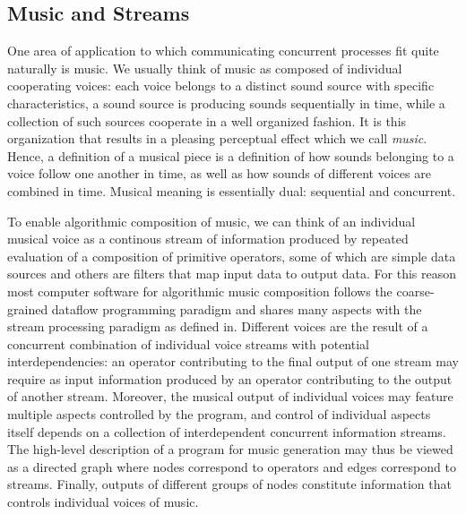 \documentclass {article}
\begin{document}
\subsection{Music and Streams}

One area of application to which communicating concurrent processes fit quite
naturally is music. We usually think of music as composed of individual
cooperating voices: each voice belongs to a distinct sound source with specific
characteristics, a sound source is producing sounds sequentially in time, while
a collection of such sources cooperate in a well organized fashion. It is this
organization that results in a pleasing perceptual effect which we call
\emph{music}. Hence, a definition of a musical piece is a definition of how
sounds belonging to a voice follow one another in time, as well as how sounds of
different voices are combined in time. Musical meaning is essentially dual:
sequential and concurrent.

To enable algorithmic composition of music, we can think of an individual
musical voice as a continous stream of information produced by repeated
evaluation of a composition of primitive operators, some of which are simple
data sources and others are filters that map input data to output data. For this
reason most computer software for algorithmic music composition follows the
coarse-grained dataflow programming paradigm and shares many aspects with the
stream processing paradigm as defined in. Different voices are
the result of a concurrent combination of individual voice streams with
potential interdependencies: an operator contributing to the final output of one
stream may require as input information produced by an operator contributing to
the output of another stream. Moreover, the musical output of individual voices
may feature multiple aspects controlled by the program, and control of
individual aspects itself depends on a collection of interdependent concurrent
information streams.
The high-level description of a program for music generation may thus be viewed
as a directed graph where nodes correspond to operators and edges correspond to
streams. Finally, outputs of different groups of nodes constitute information
that controls individual voices of music.
\end{document}

